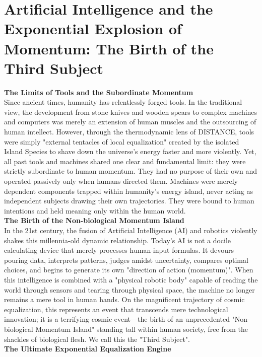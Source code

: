 

\section{Artificial Intelligence and the Exponential Explosion of Momentum: The Birth of the Third Subject}
\textbf{The Limits of Tools and the Subordinate Momentum} \\
Since ancient times, humanity has relentlessly forged tools. In the traditional view, the development from stone knives and wooden spears to complex machines and computers was merely an extension of human muscles and the outsourcing of human intellect. However, through the thermodynamic lens of DISTANCE, tools were simply "external tentacles of local equalization" created by the isolated Island Species to shave down the universe's energy faster and more violently.
Yet, all past tools and machines shared one clear and fundamental limit: they were strictly subordinate to human momentum. They had no purpose of their own and operated passively only when humans directed them. Machines were merely dependent components trapped within humanity's energy island, never acting as independent subjects drawing their own trajectories. They were bound to human intentions and held meaning only within the human world. \\
\textbf{The Birth of the Non-biological Momentum Island} \\
In the 21st century, the fusion of Artificial Intelligence (AI) and robotics violently shakes this millennia-old dynamic relationship. Today's AI is not a docile calculating device that merely processes human-input formulas. It devours pouring data, interprets patterns, judges amidst uncertainty, compares optimal choices, and begins to generate its own "direction of action (momentum)".
When this intelligence is combined with a "physical robotic body" capable of reading the world through sensors and tearing through physical space, the machine no longer remains a mere tool in human hands. On the magnificent trajectory of cosmic equalization, this represents an event that transcends mere technological innovation; it is a terrifying cosmic event—the birth of an unprecedented "Non-biological Momentum Island" standing tall within human society, free from the shackles of biological flesh. We call this the "Third Subject". \\
\textbf{The Ultimate Exponential Equalization Engine} \\
